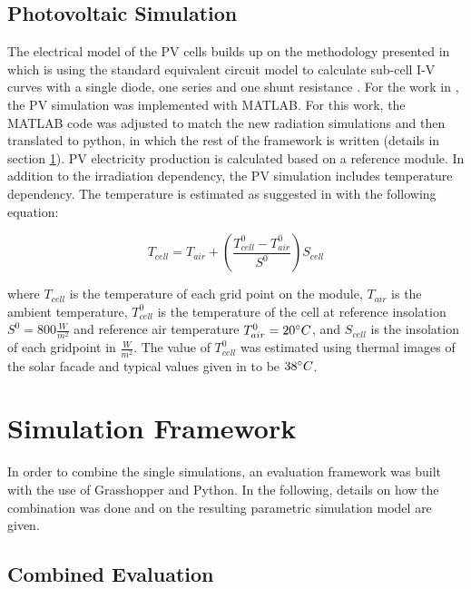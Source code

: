 		\subsection{Photovoltaic Simulation}
			The electrical model of the PV cells builds up on the methodology presented in \cite{hofer2015PVSEC} which is using the standard equivalent circuit model to calculate sub-cell I-V curves with a single diode, one series and one shunt resistance \cite{mermoud2010}. For the work in \cite{hofer2015PVSEC}, the PV simulation was implemented with MATLAB. For this work, the MATLAB code was adjusted to match the new radiation simulations and then translated to python, in which the rest of the framework is written (details in section \ref{s:simulationFramework}). PV electricity production is calculated based on a reference module. In addition to the irradiation dependency, the PV simulation includes temperature dependency. The temperature is estimated as suggested in \cite{Ross_Smokler_1986} with the following equation:

			\begin{equation}
				T_{cell} = T_{air} + \left(\frac{T_{cell}^0-T_{air}^0}{S^0}\right)S_{cell}
	      		\label{e:temp}
			\end{equation}

			where $T_{cell}$ is the temperature of each grid point on the module, $T_{air}$ is the ambient temperature, $T_{cell}^0$ is the temperature of the cell at reference insolation $S^0=800\frac{W}{m^2}$ and reference air temperature $T_{air}^0=20\degree C$, and $S_{cell}$ is the insolation of each gridpoint in $\frac{W}{m^2}$. The value of $T_{cell}^0$ was estimated using thermal images of the solar facade and typical values given in \cite{Ross_Smokler_1986} to be $38\degree C$. 



	\section{Simulation Framework}
	\label{s:simulationFramework}
		In order to combine the single simulations, an evaluation framework was built with the use of Grasshopper and Python. In the following, details on how the combination was done and on the resulting parametric simulation model are given.

		\subsection{Combined Evaluation}

